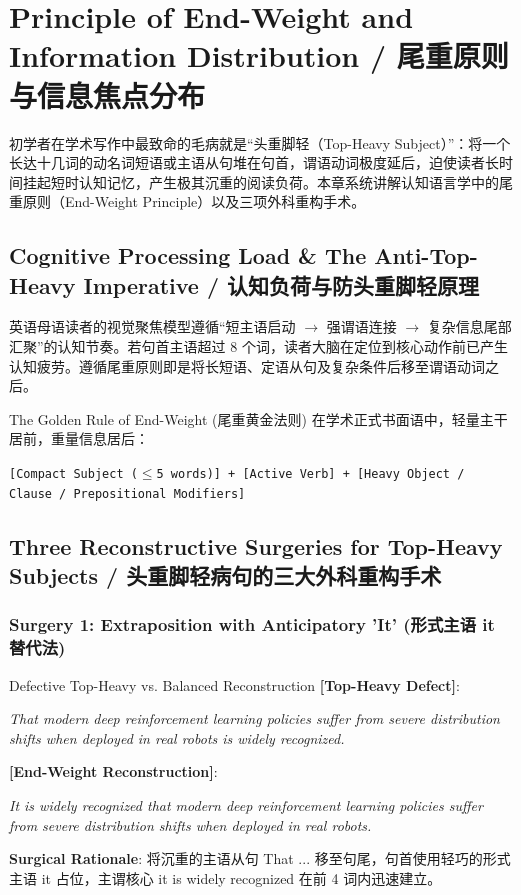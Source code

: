 \chapter{Principle of End-Weight and Information Distribution / 尾重原则与信息焦点分布}\label{ch:endweight}
初学者在学术写作中最致命的毛病就是“头重脚轻（Top-Heavy Subject）”：将一个长达十几词的动名词短语或主语从句堆在句首，谓语动词极度延后，迫使读者长时间挂起短时认知记忆，产生极其沉重的阅读负荷。本章系统讲解认知语言学中的尾重原则（End-Weight Principle）以及三项外科重构手术。

\section{Cognitive Processing Load \& The Anti-Top-Heavy Imperative / 认知负荷与防头重脚轻原理}
英语母语读者的视觉聚焦模型遵循“短主语启动 $\to$ 强谓语连接 $\to$ 复杂信息尾部汇聚”的认知节奏。若句首主语超过 8 个词，读者大脑在定位到核心动作前已产生认知疲劳。遵循尾重原则即是将长短语、定语从句及复杂条件后移至谓语动词之后。

\begin{ConceptBox}{The Golden Rule of End-Weight (尾重黄金法则)}
在学术正式书面语中，轻量主干居前，重量信息居后：\par
\begin{center}
\small\texttt{[Compact Subject ($\le$5 words)] + [Active Verb] + [Heavy Object / Clause / Prepositional Modifiers]}
\end{center}
\end{ConceptBox}

\section{Three Reconstructive Surgeries for Top-Heavy Subjects / 头重脚轻病句的三大外科重构手术}
\subsection{Surgery 1: Extraposition with Anticipatory 'It' (形式主语 it 替代法)}
\begin{ExampleBox}{Defective Top-Heavy vs. Balanced Reconstruction}
\textbf{\color{TargetHighlight}[Top-Heavy Defect]}:\par\textit{That modern deep reinforcement learning policies suffer from severe distribution shifts when deployed in real robots is widely recognized.}\par\vspace{4pt}
\textbf{\color{AcadNavy}[End-Weight Reconstruction]}:\par\textit{It is widely recognized that modern deep reinforcement learning policies suffer from severe distribution shifts when deployed in real robots.}\par\vspace{4pt}
\textbf{Surgical Rationale}: 将沉重的主语从句 That ... 移至句尾，句首使用轻巧的形式主语 it 占位，主谓核心 it is widely recognized 在前 4 词内迅速建立。
\end{ExampleBox}
\vspace{4pt}
